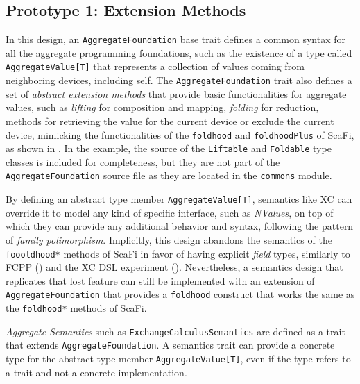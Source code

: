\subsection{Prototype 1: Extension Methods} \label{chap:design->sec:dsl->subsec:prototype-1-extension-methods}

In this design, an \texttt{AggregateFoundation} base trait defines a common syntax for all the aggregate programming foundations, such as the existence of a type called \texttt{AggregateValue[T]} that represents a collection of values coming from neighboring devices, including self.
%
The \texttt{AggregateFoundation} trait also defines a set of \textit{abstract extension methods} that provide basic functionalities for aggregate values, such as \textit{lifting} for composition and mapping, \textit{folding} for reduction, methods for retrieving the value for the current device or exclude the current device, mimicking the functionalities of the \texttt{foldhood} and \texttt{foldhoodPlus} of ScaFi, as shown in .
%
In the example, the source of the \texttt{Liftable} and \texttt{Foldable} type classes is included for completeness, but they are not part of the \texttt{AggregateFoundation} source file as they are located in the \texttt{commons} module.



By defining an abstract type member \texttt{AggregateValue[T]}, semantics like \ac{XC} can override it to model any kind of specific interface, such as \textit{NValues}, on top of which they can provide any additional behavior and syntax, following the pattern of \textit{family polimorphism}.
%
Implicitly, this design abandons the  semantics of the \texttt{foooldhood*} methods of ScaFi in favor of having explicit \textit{field} types, similarly to FCPP () and the \ac{XC} \ac{DSL} experiment ().
%
Nevertheless, a semantics design that replicates that lost feature can still be implemented with an extension of \texttt{AggregateFoundation} that provides a \texttt{foldhood} construct that works the same as the \texttt{foldhood*} methods of ScaFi.

\textit{Aggregate Semantics} such as \texttt{ExchangeCalculusSemantics} are defined as a trait that extends \texttt{AggregateFoundation}.
%
A semantics trait can provide a concrete type for the abstract type member \texttt{AggregateValue[T]}, even if the type refers to a trait and not a concrete implementation.

